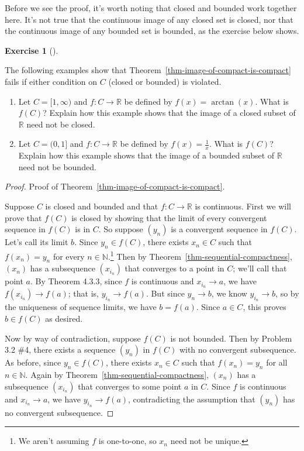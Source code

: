 \documentclass[
  letterpaper,
  DIV=11,
  numbers=noendperiod]{scrreprt}
\providecommand{\tightlist}{%
  \setlength{\itemsep}{0pt}\setlength{\parskip}{0pt}}
\def\R{\mathbb R}
\def\N{\mathbb N}
\theoremstyle{plain}
\theoremstyle{definition}
\newtheorem{exercise}{Exercise}[chapter]
\theoremstyle{plain}
\theoremstyle{plain}
\theoremstyle{definition}
\theoremstyle{definition}
\theoremstyle{remark}
\begin{document}
Before we see the proof, it's worth noting that closed and bounded work
together here. It's not true that the continuous image of any closed set
is closed, nor that the continuous image of any bounded set is bounded,
as the exercise below shows.

\begin{exercise}[]\protect\hypertarget{exr-noncompact-examples}{}\label{exr-noncompact-examples}

The following examples show that
Theorem~\ref{thm-image-of-compact-is-compact} fails if either condition
on \(C\) (closed or bounded) is violated.

\begin{enumerate}
\def\labelenumi{\arabic{enumi}.}
\tightlist
\item
  Let \(C=[1,\infty)\) and \(f:C\rightarrow\mathbb R\) be defined by
  \(f(x)=\arctan(x)\). What is \(f(C)\)? Explain how this example shows
  that the image of a closed subset of \(\mathbb R\) need not be closed.
\item
  Let \(C=(0,1]\) and \(f:C\rightarrow\mathbb R\) be defined by
  \(f(x)=\frac{1}{x}\). What is \(f(C)\)? Explain how this example shows
  that the image of a bounded subset of \(\mathbb R\) need not be
  bounded.
\end{enumerate}

\end{exercise}

\begin{proof}
Proof of Theorem~\ref{thm-image-of-compact-is-compact}.

Suppose \(C\) is closed and bounded and that \(f:C\rightarrow \R\) is
continuous. First we will prove that \(f(C)\) is closed by showing that
the limit of every convergent sequence in \(f(C)\) is in \(C\). So
suppose \((y_n)\) is a convergent sequence in \(f(C)\). Let's call its
limit \(b\). Since \(y_n\in f(C)\), there exists \(x_n\in C\) such that
\(f(x_n)=y_n\) for every \(n\in\N\).\footnote{We aren't assuming \(f\)
  is one-to-one, so \(x_n\) need not be unique.} Then by
Theorem~\ref{thm-sequential-compactness}, \((x_n)\) has a subsequence
\((x_{i_n})\) that converges to a point in \(C\); we'll call that point
\(a\). By Theorem 4.3.3, since \(f\) is continuous and
\(x_{i_n}\rightarrow a\), we have \(f(x_{i_n})\rightarrow f(a)\); that
is, \(y_{i_n}\rightarrow f(a)\). But since \(y_n\rightarrow b\), we know
\(y_{i_n}\rightarrow b\), so by the uniqueness of sequence limits, we
have \(b=f(a)\). Since \(a\in C\), this proves \(b\in f(C)\) as desired.

Now by way of contradiction, suppose \(f(C)\) is not bounded. Then by
Problem 3.2 \#4, there exists a sequence \((y_n)\) in \(f(C)\) with no
convergent subsequence. As before, since \(y_n\in f(C)\), there exists
\(x_n\in C\) such that \(f(x_n)=y_n\) for all \(n\in\N\). Again by
Theorem~\ref{thm-sequential-compactness}, \((x_n)\) has a subsequence
\((x_{i_n})\) that converges to some point \(a\) in \(C\). Since \(f\)
is continuous and \(x_{i_n}\rightarrow a\), we have
\(y_{i_n}\rightarrow f(a)\), contradicting the assumption that \((y_n)\)
has no convergent subsequence.
\end{proof}
\end{document}
